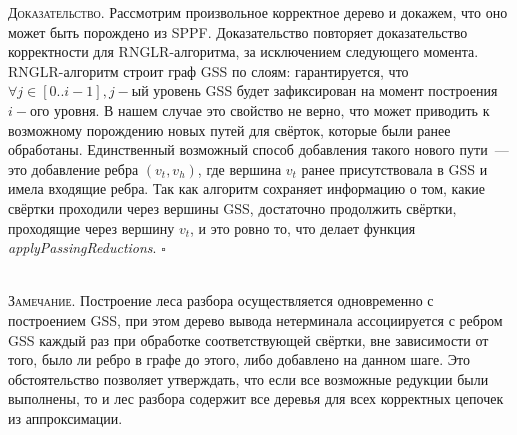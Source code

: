 \textsc{Доказательство.}
Рассмотрим произвольное корректное дерево и докажем, что оно может быть порождено из SPPF. Доказательство повторяет доказательство корректности для RNGLR-алгоритма, за исключением следующего момента. RNGLR-алгоритм строит граф GSS по слоям: гарантируется, что $\forall j \in [0..i-1], j-$ый уровень GSS будет зафиксирован на момент построения $i-$ого уровня. В нашем случае это свойство не верно, что может приводить к возможному порождению новых путей для свёрток, которые были ранее обработаны. Единственный возможный способ добавления такого нового пути~--- это добавление ребра $(v_{t}, v_{h})$, где вершина $v_{t}$ ранее присутствовала в GSS и имела входящие ребра. Так как алгоритм сохраняет информацию о том, какие свёртки проходили через вершины GSS, достаточно продолжить свёртки, проходящие через вершину $v_{t}$, и это ровно то, что делает функция \emph{applyPassingReductions}. $\square$~\\~

\textsc{Замечание.} Построение леса разбора осуществляется одновременно с построением GSS, при этом дерево вывода нетерминала ассоциируется с ребром GSS каждый раз при обработке соответствующей свёртки, вне зависимости от того, было ли ребро в графе до этого, либо добавлено на данном шаге. Это обстоятельство позволяет утверждать, что если все возможные редукции были выполнены, то и лес разбора содержит все деревья для всех корректных цепочек из аппроксимации.
